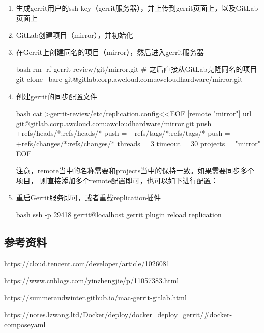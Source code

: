 \begin{enumerate}
  \item 生成gerrit用户的ssh-key（gerrit服务器），并上传到gerrit页面上，以及GitLab页面上
  \item GitLab创建项目（mirror），并初始化
  \item 在Gerrit上创建同名的项目（mirror），然后进入gerrit服务器

  \begin{code-block}{bash}
  rm -rf gerrit-review/git/mirror.git
  # 之后直接从GitLab克隆同名的项目
  git clone --bare git@gitlab.corp.awcloud.com:awcloudhardware/mirror.git
  \end{code-block}

  \item 创建gerrit的同步配置文件

  \begin{code-block}{bash}
  cat >gerrit-review/etc/replication.config<<EOF
  [remote "mirror"]
  url =  git@gitlab.corp.awcloud.com:awcloudhardware/mirror.git
  push = +refs/heads/*:refs/heads/*
  push = +refs/tags/*:refs/tags/*
  push = +refs/changes/*:refs/changes/*
  threads = 3
  timeout = 30
  projects = "mirror"
  EOF
  \end{code-block}

  注意，remote当中的名称需要和projects当中的保持一致。如果需要同步多个项目，
 则直接添加多个remote配置即可，也可以如下进行配置：
  \item 重启Gerrit服务即可，或者重载replication插件

  \begin{code-block}{bash}
  ssh -p 29418 gerrit@localhost gerrit plugin reload replication
  \end{code-block}
\end{enumerate}

\subsection{参考资料}
\url{https://cloud.tencent.com/developer/article/1026081}

\url{https://www.cnblogs.com/yinzhengjie/p/11057383.html}

\url{https://summerandwinter.github.io/mac-gerrit-gitlab.html}

\url{https://notes.lzwang.ltd/Docker/deploy/docker_deploy_gerrit/#docker-composeyaml}
